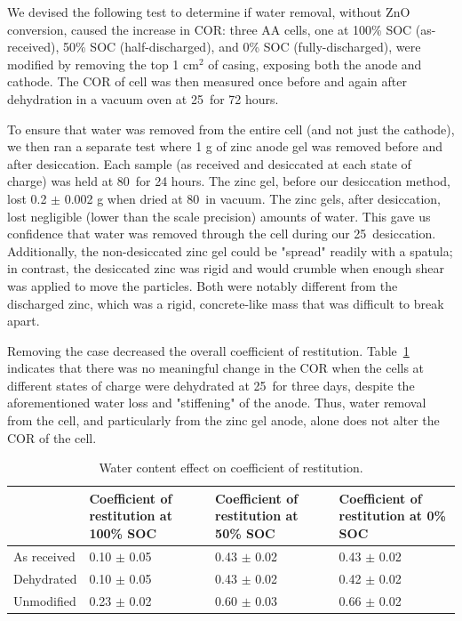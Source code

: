{We devised the following test to determine if water removal, without ZnO conversion, caused the increase in COR:  three AA cells, one at 100\% SOC (as-received), 50\% SOC (half-discharged), and 0\% SOC (fully-discharged), were modified by removing the top 1 cm$^2$ of casing, exposing both the anode and cathode.  The COR of cell was then measured once before and again after dehydration in a vacuum oven at 25\celsius~for 72 hours.

To ensure that water was removed from the entire cell (and not just the cathode), we then ran a separate test where 1 g of zinc anode gel was removed before and after desiccation. Each sample (as received and desiccated at each state of charge) was held at 80\celsius~for 24 hours. The zinc gel, before our desiccation method, lost 0.2 $\pm$ 0.002 g when dried at 80\celsius~in vacuum. The zinc gels, after desiccation, lost negligible (lower than the scale precision) amounts of water.  This gave us confidence that water was removed through the cell during our 25\celsius~desiccation. Additionally, the non-desiccated zinc gel could be "spread" readily with a spatula; in contrast, the desiccated zinc was rigid and would crumble when enough shear was applied to move the particles. Both were notably different from the discharged zinc, which was a rigid, concrete-like mass that was difficult to break apart. 

Removing the case decreased the overall coefficient of restitution. Table~\ref{tab:cortable} indicates that there was no meaningful change in the COR when the cells at different states of charge were dehydrated at 25\celsius~for three days, despite the aforementioned water loss and "stiffening" of the anode. Thus, water removal from the cell, and particularly from the zinc gel anode, alone does not alter the COR of the cell.


\begin{table}[htb]
\centering
  \begin{tabular}{p{2.5cm}p{2.5cm}p{2.5cm}p{2.5cm}}
    \hline
    & Coefficient of restitution at 100\% SOC & Coefficient of restitution at 50\% SOC & Coefficient of restitution at 0\% SOC\\
    \hline
        As received & 0.10 $\pm$ 0.05 & 0.43 $\pm$ 0.02 & 0.43 $\pm$ 0.02\\
        Dehydrated & 0.10 $\pm$ 0.05 & 0.43 $\pm$ 0.02 & 0.42 $\pm$ 0.02\\
        Unmodified & 0.23 $\pm$ 0.02 & 0.60 $\pm$ 0.03 & 0.66 $\pm$ 0.02\\
  \end{tabular}
 \caption{\label{tab:cortable}Water content effect on coefficient of restitution.}
\end{table}

}
